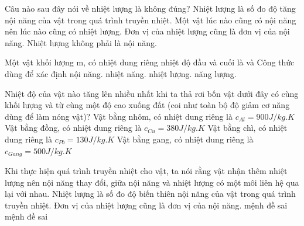 \begin{ex}
Câu nào sau đây nói về nhiệt lượng là không đúng?
\choice
{Nhiệt lượng là số đo độ tăng nội năng của vật trong quá trình truyền nhiệt.}
{\True Một vật lúc nào cũng có nội năng nên lúc nào cũng có nhiệt lượng.}
{Đơn vị của nhiệt lượng cũng là đơn vị của nội năng.}
{Nhiệt lượng không phải là nội năng.}
\end{ex}

\begin{ex}
Một vật khối lượng m, có nhiệt dung riêng nhiệt độ đầu và cuối là và Công thức
dùng để xác định
\choice
{nội năng.}
{nhiệt năng.}
{\True nhiệt lượng.}
{năng lượng.}
\end{ex}

\begin{ex}
Nhiệt độ của vật nào tăng lên nhiều nhất khi ta thả rơi bốn vật dưới đây có cùng khối lượng và từ cùng một độ cao xuống đất (coi như toàn bộ độ giảm cơ năng dùng để làm nóng vật)?
\choice
{Vật bằng nhôm, có nhiệt dung riêng là $c_{Al} = 900 J/kg.K$}
{Vật bằng đồng, có nhiệt dung riêng là $c_{Cu} = 380 J/kg.K$}
{\True Vật bằng chì, có nhiệt dung riêng là $c_{Pb} = 130 J/kg.K$}
{Vật bằng gang, có nhiệt dung riêng là $c_{Gang} = 500 J/kg.K$}
\end{ex}

\begin{ex}
Khi thực hiện quá trình truyền nhiệt cho vật, ta nói rằng vật nhận thêm nhiệt lượng nên nội năng thay đổi, giữa nội năng và nhiệt lượng có một môi liên hệ qua lại với nhau.
\choiceTF
{\True Nhiệt lượng là số đo độ biến thiên nội năng của vật trong quá trình truyền nhiệt.}
{\True Đơn vị của nhiệt lượng cũng là đơn vị của nội năng.}
{mệnh đề sai}
{mệnh đề sai}
\end{ex}

